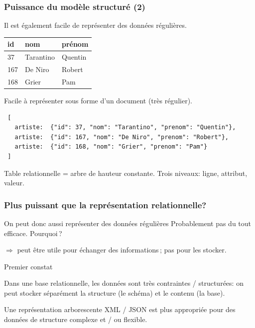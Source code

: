 \begin{frame}[fragile]
\frametitle{Puissance du modèle structuré (2)}

Il est également facile de représenter des données régulières. 

\medskip

   \begin{tabular}[!ht]{l|l|l}
    \textbf{id} & \textbf{nom} & \textbf{prénom} \\
     \hline
    37 & Tarantino & Quentin \\
     \hline
    167 & De Niro & Robert \\
     \hline
    168 & Grier & Pam \\
     \hline
   \end{tabular}
   
 \vfill
 
Facile à représenter sous forme d'un document (très régulier).

\medskip
   
\begin{verbatim}
 [
   artiste:  {"id": 37, "nom": "Tarantino", "prenom": "Quentin"},
   artiste:  {"id": 167, "nom": "De Niro", "prenom": "Robert"},
   artiste:  {"id": 168, "nom": "Grier", "prenom": "Pam"} 
 ] 
\end{verbatim}

\vfill

Table relationnelle = arbre de hauteur constante. Trois niveaux: ligne, attribut, valeur.

\end{frame}

\begin{frame}[fragile]
\frametitle{Plus puissant que la représentation relationnelle?}


\begin{remblock}{On peut donc aussi représenter des données régulières}
Probablement pas du tout efficace. \alert{Pourquoi\,?}
\end{remblock}

$\Rightarrow$ peut être utile pour échanger des informations\,; pas pour les
stocker.

\vfill

\begin{beamerboxesrounded}{Premier constat}

\begin{redbullet}
  \item Dans une base relationnelle, les données sont très contraintes / structurées: \alert{on peut stocker
  séparément la structure (le schéma) et le contenu (la base)}.
  \item Une représentation arborescente XML / JSON est plus appropriée pour des données de structure
       \alert{complexe} et / ou \alert{flexible}.
\end{redbullet}
\end{beamerboxesrounded}


\end{frame}


